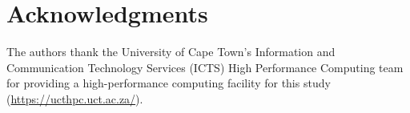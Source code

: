 \documentclass[article]{jss}
\begin{document}
\section*{Acknowledgments}

The authors thank the University of Cape Town's Information and Communication
Technology Services (ICTS) High Performance
Computing team for providing a high-performance computing facility for this
study (\url{https://ucthpc.uct.ac.za/}).


\end{document}
